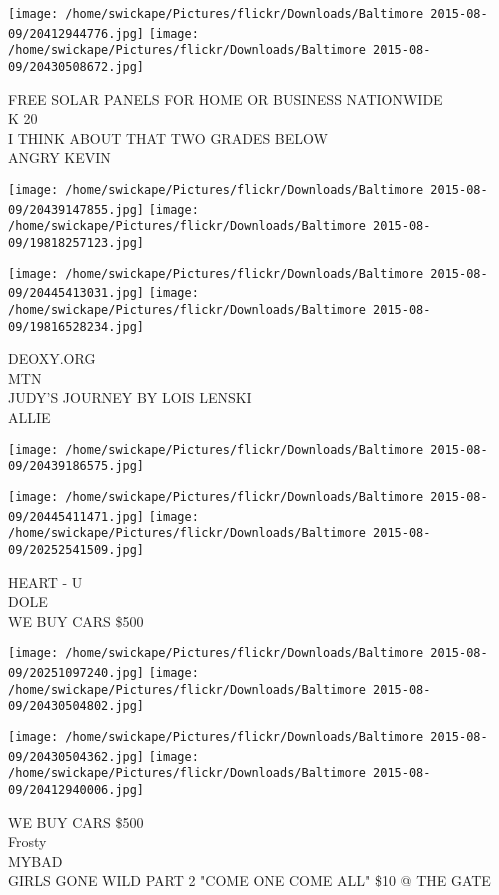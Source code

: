 \documentclass[10pt,letterpaper]{article}
\begin{document}
\texttt{[image: /home/swickape/Pictures/flickr/Downloads/Baltimore 2015-08-09/20412944776.jpg]}
\texttt{[image: /home/swickape/Pictures/flickr/Downloads/Baltimore 2015-08-09/20430508672.jpg]}

FREE SOLAR PANELS FOR HOME OR BUSINESS NATIONWIDE\\
K 20\\
I THINK ABOUT THAT TWO GRADES BELOW\\
ANGRY KEVIN
\pagebreak

\texttt{[image: /home/swickape/Pictures/flickr/Downloads/Baltimore 2015-08-09/20439147855.jpg]}
\texttt{[image: /home/swickape/Pictures/flickr/Downloads/Baltimore 2015-08-09/19818257123.jpg]}

\texttt{[image: /home/swickape/Pictures/flickr/Downloads/Baltimore 2015-08-09/20445413031.jpg]}
\texttt{[image: /home/swickape/Pictures/flickr/Downloads/Baltimore 2015-08-09/19816528234.jpg]}

DEOXY.ORG\\
MTN\\
JUDY'S JOURNEY BY LOIS LENSKI\\
ALLIE
\pagebreak

\texttt{[image: /home/swickape/Pictures/flickr/Downloads/Baltimore 2015-08-09/20439186575.jpg]}

\vspace{0.25in}
\texttt{[image: /home/swickape/Pictures/flickr/Downloads/Baltimore 2015-08-09/20445411471.jpg]}
\texttt{[image: /home/swickape/Pictures/flickr/Downloads/Baltimore 2015-08-09/20252541509.jpg]}

HEART {-} U\\
DOLE\\
WE BUY CARS \$500
\pagebreak

\texttt{[image: /home/swickape/Pictures/flickr/Downloads/Baltimore 2015-08-09/20251097240.jpg]}
\texttt{[image: /home/swickape/Pictures/flickr/Downloads/Baltimore 2015-08-09/20430504802.jpg]}

\texttt{[image: /home/swickape/Pictures/flickr/Downloads/Baltimore 2015-08-09/20430504362.jpg]}
\texttt{[image: /home/swickape/Pictures/flickr/Downloads/Baltimore 2015-08-09/20412940006.jpg]}

WE BUY CARS \$500\\
Frosty\\
MYBAD\\
GIRLS GONE WILD PART 2 "COME ONE COME ALL" \$10 @ THE GATE
\pagebreak
\end{document}

